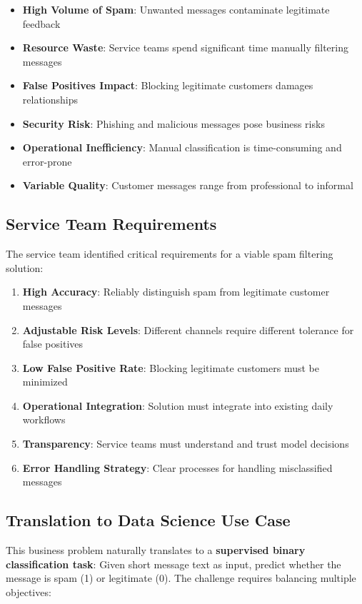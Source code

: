 \documentclass[12pt,a4paper]{article}
\begin{document}
\begin{itemize}
    \item \textbf{High Volume of Spam}: Unwanted messages contaminate legitimate feedback
    \item \textbf{Resource Waste}: Service teams spend significant time manually filtering messages
    \item \textbf{False Positives Impact}: Blocking legitimate customers damages relationships
    \item \textbf{Security Risk}: Phishing and malicious messages pose business risks
    \item \textbf{Operational Inefficiency}: Manual classification is time-consuming and error-prone
    \item \textbf{Variable Quality}: Customer messages range from professional to informal
\end{itemize}

\subsection{Service Team Requirements}

The service team identified critical requirements for a viable spam filtering solution:

\begin{enumerate}
    \item \textbf{High Accuracy}: Reliably distinguish spam from legitimate customer messages
    \item \textbf{Adjustable Risk Levels}: Different channels require different tolerance for false positives
    \item \textbf{Low False Positive Rate}: Blocking legitimate customers must be minimized
    \item \textbf{Operational Integration}: Solution must integrate into existing daily workflows
    \item \textbf{Transparency}: Service teams must understand and trust model decisions
    \item \textbf{Error Handling Strategy}: Clear processes for handling misclassified messages
\end{enumerate}

\subsection{Translation to Data Science Use Case}

This business problem naturally translates to a \textbf{supervised binary classification task}: Given short message text as input, predict whether the message is spam (1) or legitimate (0). The challenge requires balancing multiple objectives:
\end{document}
